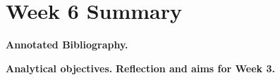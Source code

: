 \documentclass{article}
\begin{document}
\section*{Week 6 Summary}

\vspace{0.5cm}

\textbf{Annotated Bibliography.}


\textbf{Analytical objectives.}
\textbf{Reflection and aims for Week 3.}
\end{document}

